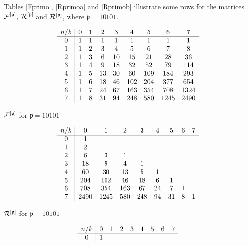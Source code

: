 \begin{example}
Tables \ref{Fprimo}, \ref{Rprimoa} and \ref{Rprimob}
illustrate some rows for the matrices ${\cal{F}^{[\mathfrak{p}]}},$
${\cal{R}^{[\mathfrak{p}]}}$ and ${\cal{R}^{[\bar{\mathfrak{p}]}}}$, where
$\mathfrak{p}=10101$.
\begin{table}[htb]
$$
\begin{array}{c|cccccccc}
n/k  & 0 & 1 & 2 & 3 & 4 &5 &6 &7  \\ \cline{1-9}
0 & 1 & 1 & 1 & 1& 1 &  1 & 1 & 1\\
1 & 1 & 2 & 3 & 4 & 5 & 6 & 7 & 8 \\
2 & 1 & 3 & 6 & 10 & 15 & 21 & 28 & 36\\
3 & 1 & 4 & 9 & 18 & 32 & 52& 79 & 114\\
4 & 1& 5 & 13 & 30 & 60 & 109& 184 & 293\\
5 & 1 & 6 & 18 & 46 & 102 & 204 & 377 & 654\\
6 & 1 & 7 & 24 & 67 & 163 & 354& 708 & 1324\\
7 & 1 & 8 & 31 & 94 & 248 &580& 1245 &2490\\
\end{array}
$$
\caption{\label{Fprimo} ${\cal{F}^{[\mathfrak{p}]}}$ for $\mathfrak{p}=10101$}
\end{table}
\begin{table}[htb]
$$
\begin{array}{c|cccccccc}
n/k  & 0 & 1 & 2 & 3 & 4 &5 &6 &7  \\ \cline{1-9}
0 & 1 & & & & & & &\\
1 & 2 & 1 & & &  & & &\\
2 & 6& 3 & 1 & & & &  &\\
3 & 18 & 9 & 4 & 1 & & &  &\\
4 & 60 & 30 & 13 & 5 & 1& & & \\
5 & 204 & 102 & 46 & 18 & 6 &1 & &\\
6 & 708 & 354 & 163 & 67 & 24 & 7& 1 &\\
7 & 2490 & 1245 &  580 &248 & 94 & 31 &  8 &1\\
\end{array}
$$
\caption{\label{Rprimoa} ${\cal{R}^{[\mathfrak{p}]}}$ for $\mathfrak{p}=10101$}
\end{table}
\begin{table}[htb]
$$
\begin{array}{c|cccccccc}
n/k  & 0 & 1 & 2 & 3 & 4 &5 &6 &7  \\ \cline{1-9}
0 & 1 & & & & & & &\\

\end{array}$$
\end{table}
\end{example}

